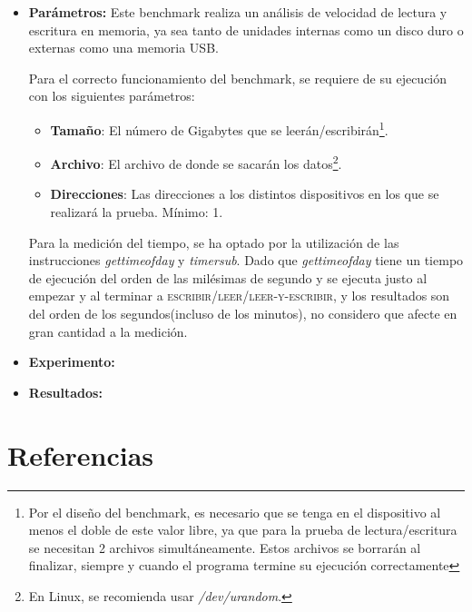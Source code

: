 \documentclass[paper=a4, fontsize=11pt]{scrartcl} %
\numberwithin{equation}{section} %
\numberwithin{figure}{section} %
\numberwithin{table}{section} %
\begin{document}
\begin{enumerate}
		\begin{itemize}
			\item \large\textbf{Parámetros:}
				Este benchmark realiza un análisis de velocidad de lectura y escritura en memoria, ya
				sea tanto de unidades internas como un disco duro o externas como una memoria USB.
				
				Para el correcto funcionamiento del benchmark, se requiere de su ejecución con los
				siguientes parámetros:
				
				\begin{itemize}
					\item \textbf{Tamaño}: El número de Gigabytes que se leerán/escribirán\footnote{Por
					el diseño del benchmark, es necesario que se tenga en el dispositivo al menos el
					doble de este valor libre, ya que para la prueba de lectura/escritura se necesitan
					2 archivos simultáneamente. Estos archivos se borrarán al finalizar, siempre y cuando
					el programa termine su ejecución correctamente}.
					
					\item \textbf{Archivo}: El archivo de donde se sacarán los datos\footnote{En Linux,
					se recomienda usar \textit{/dev/urandom}.}.
					
					\item \textbf{Direcciones}: Las direcciones a los distintos dispositivos en los que
					se realizará la prueba. Mínimo: 1.
				\end{itemize}
				
				Para la medición del tiempo, se ha optado por la utilización de las instrucciones
				\textit{gettimeofday} y \textit{timersub}. Dado que \textit{gettimeofday} tiene un
				tiempo de ejecución del orden de las milésimas de segundo y se ejecuta justo al empezar
				y al terminar a \textsc{escribir}/\textsc{leer}/\textsc{leer-y-escribir}, y los
				resultados son del orden de los segundos(incluso de los minutos), no considero que afecte
				en gran cantidad a la medición.
				
			\item \large\textbf{Experimento:}
				
			\item \large\textbf{Resultados:}
		\end{itemize}
		
		
\end{enumerate}

\newpage
\section{Referencias}

\end{document}
